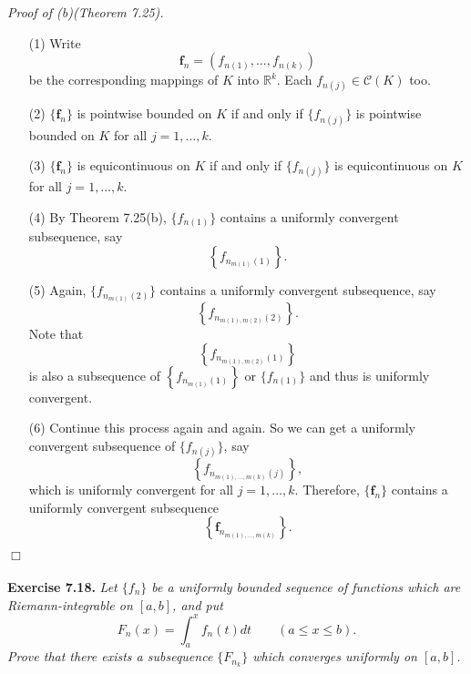 \documentclass{article}
\begin{document}
\emph{Proof of (b)(Theorem 7.25).}
\begin{enumerate}
\item[(1)]
  Write
  \[
    \mathbf{f}_n = \left(f_{n(1)}, \ldots, f_{n(k)}\right)
  \]
  be the corresponding mappings of $K$ into $\mathbb{R}^k$.
  Each $f_{n(j)} \in \mathscr{C}(K)$ too.

\item[(2)]
  $\{\mathbf{f}_n\}$ is pointwise bounded on $K$
  if and only if
  $\{ f_{n(j)} \}$ is pointwise bounded on $K$ for all $j=1,\ldots,k$.

\item[(3)]
  $\{\mathbf{f}_n\}$ is equicontinuous on $K$
  if and only if
  $\{ f_{n(j)} \}$ is equicontinuous on $K$ for all $j=1,\ldots,k$.

\item[(4)]
  By Theorem 7.25(b),
  $\{ f_{n(1)} \}$ contains a uniformly convergent subsequence,
  say
  \[
    \left\{ f_{n_{m(1)}(1)} \right\}.
  \]

\item[(5)]
  Again,
  $\{ f_{n_{m(1)}(2)} \}$ contains a uniformly convergent subsequence,
  say
  \[
    \left\{ f_{n_{m(1),m(2)}(2)} \right\}.
  \]
  Note that
  \[
    \left\{ f_{n_{m(1),m(2)}(1)} \right\}
  \]
  is also a subsequence of $\left\{ f_{n_{m(1)}(1)} \right\}$ or $\{f_{n(1)}\}$
  and thus is uniformly convergent.

\item[(6)]
  Continue this process again and again.
  So we can get a uniformly convergent subsequence of $\{ f_{n(j)} \}$,
  say
  \[
    \left\{ f_{n_{m(1),\ldots,m(k)}(j)} \right\},
  \]
  which is uniformly convergent for all $j=1,\ldots,k$.
  Therefore,
  $\{\mathbf{f}_n\}$ contains a uniformly convergent subsequence
  \[
    \left\{ \mathbf{f}_{n_{m(1),\ldots,m(k)}} \right\}.
  \]
  \end{enumerate}
$\Box$ \\\\






\textbf{Exercise 7.18.}
\emph{Let $\{f_n\}$ be a uniformly bounded sequence of functions which are
Riemann-integrable on $[a,b]$, and put
\[
  F_n(x) = \int_{a}^{x} f_n(t)dt
  \qquad
  (a \leq x \leq b).
\]
Prove that there exists a subsequence $\{F_{n_k}\}$ which
converges uniformly on $[a,b]$.} \\
\end{document}
